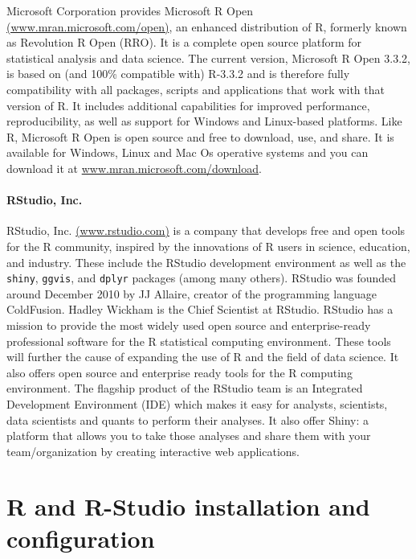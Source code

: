 \documentclass[]{book}
\begin{document}
Microsoft Corporation provides Microsoft R Open
\href{https://mran.microsoft.com/open/}{(www.mran.microsoft.com/open)},
an enhanced distribution of R, formerly known as Revolution R Open
(RRO). It is a complete open source platform for statistical analysis
and data science. The current version, Microsoft R Open 3.3.2, is based
on (and 100\% compatible with) R-3.3.2 and is therefore fully
compatibility with all packages, scripts and applications that work with
that version of R. It includes additional capabilities for improved
performance, reproducibility, as well as support for Windows and
Linux-based platforms. Like R, Microsoft R Open is open source and free
to download, use, and share. It is available for Windows, Linux and Mac
Os operative systems and you can download it at
\href{https://mran.microsoft.com/download/}{www.mran.microsoft.com/download}.

\subsubsection{RStudio, Inc.}\label{rstudio-inc.}

RStudio, Inc. \href{http://www.rstudio.com/}{(www.rstudio.com)} is a
company that develops free and open tools for the R community, inspired
by the innovations of R users in science, education, and industry. These
include the RStudio development environment as well as the
\texttt{shiny}, \texttt{ggvis}, and \texttt{dplyr} packages (among many
others). RStudio was founded around December 2010 by JJ Allaire, creator
of the programming language ColdFusion. Hadley Wickham is the Chief
Scientist at RStudio. RStudio has a mission to provide the most widely
used open source and enterprise-ready professional software for the R
statistical computing environment. These tools will further the cause of
expanding the use of R and the field of data science. It also offers
open source and enterprise ready tools for the R computing environment.
The flagship product of the RStudio team is an Integrated Development
Environment (IDE) which makes it easy for analysts, scientists, data
scientists and quants to perform their analyses. It also offer Shiny: a
platform that allows you to take those analyses and share them with your
team/organization by creating interactive web applications.

\chapter{R and R-Studio installation and
configuration}\label{r-and-r-studio-installation-and-configuration}
\end{document}
